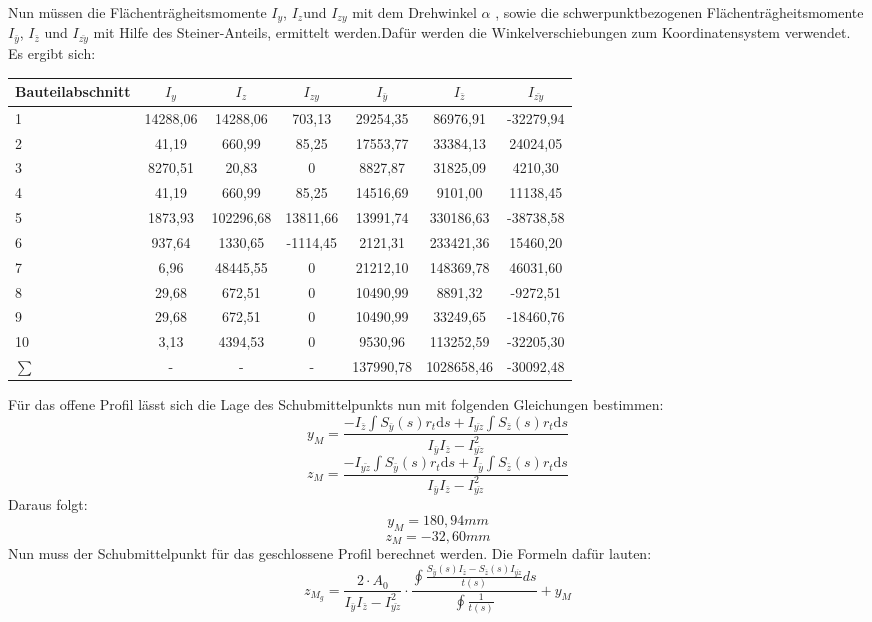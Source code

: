 Nun müssen die Flächenträgheitsmomente $I_{y}$, $I_{z}$und $I_{zy}$ mit dem Drehwinkel $\alpha$ , sowie die schwerpunktbezogenen Flächenträgheitsmomente $I_{\bar{y}}$, $I_{\bar{z}}$ und $I_{\bar{zy}}$ mit Hilfe des Steiner-Anteils, ermittelt werden.Dafür werden die Winkelverschiebungen zum Koordinatensystem verwendet.
Es ergibt sich:
\begin{center}

\begin{tabular}[h]{l|c|c|c||c|c|c}
Bauteilabschnitt&$I_{y}$&$I_{z}$&$I_{zy}$&$I_{\bar{y}}$&$I_{\bar{z}}$&$I_{\bar{zy}}$\\
\hline
1&14288,06&14288,06&703,13&29254,35&86976,91&-32279,94\\
2&41,19&660,99&85,25&17553,77&33384,13&24024,05\\
3&8270,51&20,83&0&8827,87&31825,09&4210,30\\
4&41,19&660,99&85,25&14516,69&9101,00&11138,45\\
5&1873,93&102296,68&13811,66&13991,74&330186,63&-38738,58\\
6&937,64&1330,65&-1114,45&2121,31&233421,36&15460,20\\
7&6,96&48445,55&0&21212,10&148369,78&46031,60\\
8&29,68&672,51&0&10490,99&8891,32&-9272,51\\
9&29,68&672,51&0&10490,99&33249,65&-18460,76\\
10&3,13&4394,53&0&9530,96&113252,59&-32205,30\\
\hline
$\sum{}$&-&-&-&137990,78&1028658,46&-30092,48
\end{tabular}
\end{center}
Für das offene Profil lässt sich die Lage des Schubmittelpunkts nun mit folgenden Gleichungen bestimmen:
\begin{equation}
	y_{M}=\frac{-I_{\bar{z}}\int S_{\bar{y}}(s) r_{t}\mathrm{d}s+I_{\bar{yz}}\int S_{\bar{z}}(s) r_{t}\mathrm{d}s}{I_{\bar{y}}I_{\bar{z}}-I_{\bar{yz}}^2}
\end{equation}
\begin{equation}
	z_{M}=\frac{-I_{\bar{yz}}\int S_{\bar{y}}(s) r_{t}\mathrm{d}s+I_{\bar{y}}\int S_{\bar{z}}(s) r_{t}\mathrm{d}s}{I_{\bar{y}}I_{\bar{z}}-I_{\bar{yz}}^2}
\end{equation}
Daraus folgt:
\begin{equation}
	y_{M}=180,94mm
\end{equation}
\begin{equation}
	z_{M}=-32,60mm
\end{equation}
Nun muss der Schubmittelpunkt für das geschlossene Profil berechnet werden. Die Formeln dafür lauten:
\begin{equation}
	z_{M_{g}}=
	\frac{2\cdot A_{0}}{I_{\bar{y}}I_{\bar{z}}-I_{\bar{yz}}^2}
	\cdot\frac{
		\oint
		\frac{
			S_{\bar{y}}(s)I_{\bar{z}}-S_{\bar{z}}(s)I_{\bar{yz}}
		}
		{t(s)} ds
	}
	{\oint\frac{1}{t(s)}} +y_{M}
\end{equation}

